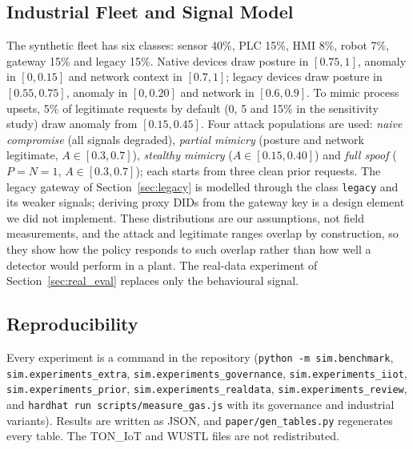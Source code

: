 \subsection{Industrial Fleet and Signal Model}\label{sec:devsim}
The synthetic fleet has six classes: sensor 40\%, PLC 15\%, HMI 8\%, robot 7\%, gateway 15\% and legacy 15\%. Native devices draw posture in $[0.75,1]$, anomaly in $[0,0.15]$ and network context in $[0.7,1]$; legacy devices draw posture in $[0.55,0.75]$, anomaly in $[0,0.20]$ and network in $[0.6,0.9]$. To mimic process upsets, 5\% of legitimate requests by default (0, 5 and 15\% in the sensitivity study) draw anomaly from $[0.15,0.45]$. Four attack populations are used: \emph{naive compromise} (all signals degraded), \emph{partial mimicry} (posture and network legitimate, $A\in[0.3,0.7]$), \emph{stealthy mimicry} ($A\in[0.15,0.40]$) and \emph{full spoof} ($P=N=1$, $A\in[0.3,0.7]$); each starts from three clean prior requests. The legacy gateway of Section~\ref{sec:legacy} is modelled through the class \texttt{legacy} and its weaker signals; deriving proxy DIDs from the gateway key is a design element we did not implement. These distributions are our assumptions, not field measurements, and the attack and legitimate ranges overlap by construction, so they show how the policy responds to such overlap rather than how well a detector would perform in a plant. The real-data experiment of Section~\ref{sec:real_eval} replaces only the behavioural signal.

\subsection{Reproducibility}\label{sec:scenarios}
Every experiment is a command in the repository (\texttt{python -m sim.benchmark}, \texttt{sim.experiments\_extra}, \texttt{sim.experiments\_governance}, \texttt{sim.experiments\_iiot}, \texttt{sim.experiments\_prior}, \texttt{sim.experiments\_realdata}, \texttt{sim.experiments\_review}, and \texttt{hardhat run scripts/measure\_gas.js} with its governance and industrial variants). Results are written as JSON, and \texttt{paper/gen\_tables.py} regenerates every table. The TON\_IoT and WUSTL files are not redistributed.
